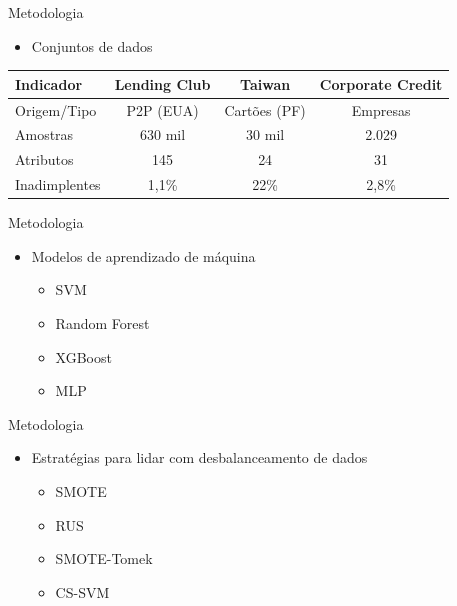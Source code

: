 \begin{frame}{Metodologia}
  \begin{itemize}
    \item[$\blacktriangleright$] Conjuntos de dados
  \end{itemize}

  \vspace{-0.4em}
  \footnotesize
  \setlength{\tabcolsep}{3pt}
  \renewcommand{\arraystretch}{1.15}

  \begin{table}[h]
    \centering
    \begin{tabular}{|l|c|c|c|}
      \hline
      \textbf{Indicador} & \textbf{Lending Club} & \textbf{Taiwan} & \textbf{Corporate Credit} \\
      \hline
      Origem/Tipo & P2P (EUA) & Cartões (PF) & Empresas \\
      \hline
      Amostras & 630 mil & 30 mil & 2.029 \\
      \hline
      Atributos & 145 & 24 & 31 \\
      \hline
      Inadimplentes & 1,1\% & 22\% & 2,8\% \\
      \hline
    \end{tabular}
  \end{table}
  \normalsize
\end{frame}

\begin{frame}{Metodologia}
  \begin{itemize}
    \item[$\blacktriangleright$] Modelos de aprendizado de máquina
      \begin{itemize}
        \item SVM
        \item Random Forest
        \item XGBoost
        \item MLP
      \end{itemize}
  \end{itemize}
\end{frame}

\begin{frame}{Metodologia}
  \begin{itemize}
    \item[$\blacktriangleright$] Estratégias para lidar com desbalanceamento de dados
      \begin{itemize}
        \item SMOTE~\cite{Fernndez2018}
        \item RUS~\cite{Yang2024}
        \item SMOTE-Tomek~\cite{Pereira2020}
        \item CS-SVM~\cite{Iranmehr2019}
      \end{itemize}
  \end{itemize}
\end{frame}

